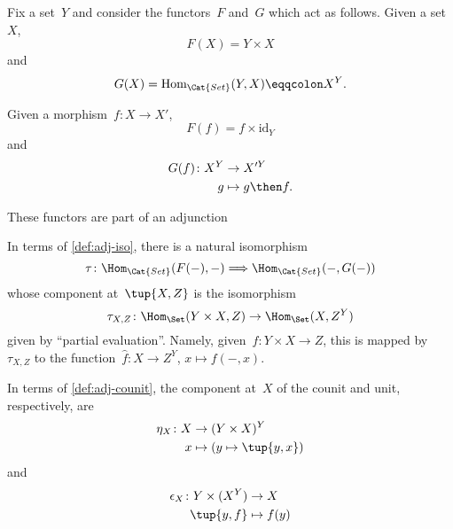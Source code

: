 Fix a set~$Y$ and consider the functors~$F$ and~$G$ which act as follows. Given a set~$X$,
\begin{equation*}
    F(X) = Y \times X
\end{equation*}
and
\begin{equation*}
    G(X) = \text{Hom}_{\Cat{Set}}(Y, X) \eqqcolon X^Y.
\end{equation*}

Given a morphism~$f\colon X \to X'$,
\begin{equation*}
    F(f) = f \times \text{id}_Y
\end{equation*}
and
\begin{equation*}
    \begin{aligned}
        G(f)\colon X^Y &\to X'^Y\\
        g &\mapsto g \then f.
    \end{aligned}
\end{equation*}

These functors are part of an adjunction

\begin{center}
\end{center}
In terms of \cref{def:adj-iso}, there is a natural isomorphism
\begin{equation*}
    \tau\colon \Hom_{\Cat{Set}}(F(- ), - )  \Longrightarrow  \Hom_{\Cat{Set}}(- , G( - ))
\end{equation*}
whose component at~$\tup{X,Z}$ is the isomorphism
\begin{equation*}
    \tau_{X,Z} \colon \Hom_{\Set}(Y \times X, Z) \to \Hom_{\Set}(X, Z^Y)
\end{equation*}
given by ``partial evaluation''. Namely, given~$f\colon Y \times X \to Z$,  this is mapped by~$\tau_{X,Z}$ to the function~$\hat f\colon X \to Z^Y$, $x \mapsto f( -, x)$.

In terms of \cref{def:adj-counit}, the component at~$X$ of the counit and unit, respectively, are
\begin{equation*}
    \begin{aligned}
        \eta_X \colon X &\to  (Y \times X)^Y\\
        x &\mapsto (y \mapsto \tup{y,x})
    \end{aligned}
\end{equation*}
and
\begin{equation*}
    \begin{aligned}
        \epsilon_X \colon Y \times (X^Y) &\to X\\
        \tup{y,f} &\mapsto f(y)
    \end{aligned}
\end{equation*}


